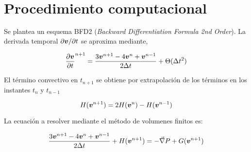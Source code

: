 \section{Procedimiento computacional}

Se plantea un esquema BFD2 (\textit{Backward Differentiation Formula 2nd Order}). La derivada temporal $\partial \boldsymbol{v} / \partial t$ se aproxima mediante,

\begin{equation}
\dfrac{\partial \boldsymbol{v}}{\partial t} ^ {n+1} = \dfrac{3 \boldsymbol{v}^{n+1} -4\boldsymbol{v}^n + \boldsymbol{v}^{n-1}}{2 \Delta t} + \Theta(\Delta t^2) 
\end{equation}

El término convectivo en $t_{n+1}$ se obtiene por extrapolación de los términos en los instantes $t_{n}$ y $t_{n-1}$

\begin{equation}
H(\boldsymbol{v}^{n+1}) = 2 H(\boldsymbol{v}^n) - H(\boldsymbol{v}^{n-1})
\end{equation}

La ecuación a resolver mediante el método de volumenes finitos es:

\begin{equation} \label{ecuación_gobernante}
\dfrac{3 \boldsymbol{v}^{n+1} -4\boldsymbol{v}^n + \boldsymbol{v}^{n-1}}{2 \Delta t} + H(\boldsymbol{v}^{n+1}) = -\vec{\nabla} P + G(\boldsymbol{v}^{n+1})
\end{equation}

